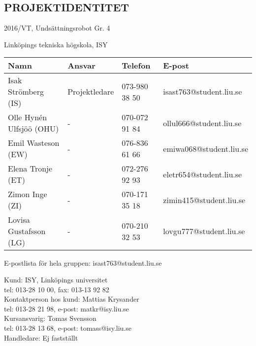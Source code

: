 \documentclass[11pt]{article}
\begin{document}
\pagebreak
\begin{center}

\section*{PROJEKTIDENTITET}
2016/VT, Undsättningsrobot Gr. 4

Linköpings tekniska högskola, ISY
\vspace{5em}
\begin{center}

\begin{tabular}{|l|l|l|l|} \hline
\textbf{Namn} & \textbf{Ansvar} & \textbf{Telefon} & \textbf{E-post}  \\ \hline 
Isak Strömberg (IS) & Projektledare & 073-980 38 50 & isast763@student.liu.se \\ \hline
Olle Hynén Ulfsjöö (OHU)& - & 070-072 91 84 & ollul666@student.liu.se \\ \hline
Emil Wasteson (EW) & - & 076-836 61 66 & emiwa068@student.liu.se \\ \hline
Elena Tronje (ET) & - & 072-276 92 93 & eletr654@student.liu.se \\ \hline
Zimon Inge (ZI)& - & 070-171 35 18 & zimin415@student.liu.se \\ \hline
Lovisa Gustafsson (LG) & - & 070-210 32 53 & lovgu777@student.liu.se \\ \hline
\end{tabular}

\end{center}

E-postlista för hela gruppen: isast763@student.liu.se

\vspace{5em}
Kund: ISY, Linköpings universitet \\
tel: 013-28 10 00, fax: 013-13 92 82 \\
Kontaktperson hos kund: Mattias Krysander \\
tel: 013-28 21 98, e-post: matkr@isy.liu.se \\

\vspace{5em}
Kursansvarig:  Tomas Svensson\\
tel: 013-28 13 68, e-post: tomass@isy.liu.se \\
Handledare: Ej fastställt
\end{center}
\pagebreak

\tableofcontents

\pagebreak
\end{document}
